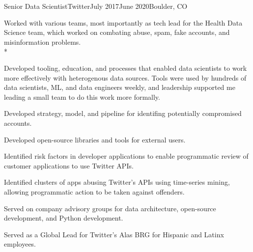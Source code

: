 \documentclass[print]{friggeri-cv} %
\begin{document}
\begin{job}
  {\twittericon}{Senior Data Scientist}{Twitter}{July 2017}{June 2020}{Boulder, CO}{
    Worked with various teams, most importantly as tech lead for the Health Data Science team,
    which worked on combating abuse, spam, fake accounts, and misinformation problems.\\*
    \begin{myitemize}
      \item Developed tooling, education, and processes that enabled data scientists to work more effectively
      with heterogenous data sources. Tools were used by hundreds of data scientists, ML, and data
      engineers weekly, and leadership supported me leading a small team to do this work more formally.

      \item Developed strategy, model, and pipeline for identifing potentially compromised accounts.

      \item Developed open-source libraries and tools for external
      users.\autocite{search_tweets_python,do_more_with_twitter_data}

      \item Identified risk factors in developer applications to enable programmatic review of customer
      applications to use Twitter APIs.

      \item Identified clusters of apps abusing Twitter's APIs using time-series mining, allowing programmatic
      action to be taken against offenders.

      \item Served on company advisory groups for data architecture, open-source development, and Python
      development.

      \item Served as a Global Lead for Twitter's Alas BRG for Hispanic and Latinx employees.

    \end{myitemize}
  }
\end{job}
\end{document}
